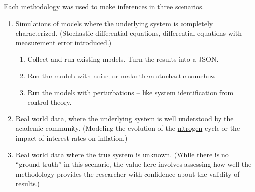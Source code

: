 \documentclass{article}
\begin{document}
Each methodology was used to make inferences in three scenarios.
\begin{enumerate}
    \item Simulations of models where the underlying system is completely characterized. 
    (Stochastic differential equations, differential equations with measurement
    error introduced.)

    \begin{enumerate}
        \item Collect and run existing models. Turn the results into a JSON.
        \item Run the models with noise, or make them stochastic somehow
        \item Run the models with perturbations -- like system identification
        from control theory.
    \end{enumerate}

    \item Real world data, where the underlying system is well understood by the academic community.
    (Modeling the evolution of the \href{https://www.sciencedirect.com/science/article/pii/S0045653520316866}{nitrogen}
    cycle or the impact of interest rates on inflation.)
    \item Real world data where the true system is unknown. (While there is no ``ground truth''
    in this scenario, the value here involves assessing how well the methodology provides the
    researcher with confidence about the validity of results.)
\end{enumerate}




\end{document}
